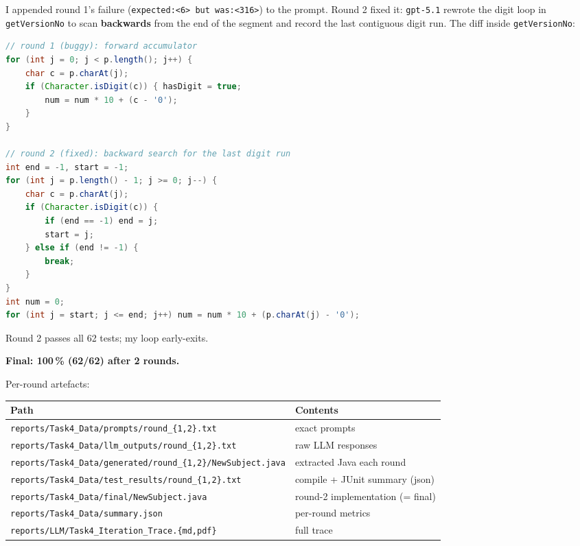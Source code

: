 \documentclass[manuscript,review,nonacm]{acmart}
\begin{document}
I appended round 1's failure (\texttt{expected:<6> but was:<316>}) to
the prompt. Round 2 fixed it: \texttt{gpt-5.1} rewrote the digit loop
in \texttt{getVersionNo} to scan \textbf{backwards} from the end of
the segment and record the last contiguous digit run. The diff inside
\texttt{getVersionNo}:

\begin{lstlisting}[language=Java]
// round 1 (buggy): forward accumulator
for (int j = 0; j < p.length(); j++) {
    char c = p.charAt(j);
    if (Character.isDigit(c)) { hasDigit = true;
        num = num * 10 + (c - '0');
    }
}

// round 2 (fixed): backward search for the last digit run
int end = -1, start = -1;
for (int j = p.length() - 1; j >= 0; j--) {
    char c = p.charAt(j);
    if (Character.isDigit(c)) {
        if (end == -1) end = j;
        start = j;
    } else if (end != -1) {
        break;
    }
}
int num = 0;
for (int j = start; j <= end; j++) num = num * 10 + (p.charAt(j) - '0');
\end{lstlisting}

Round 2 passes all 62 tests; my loop early-exits.

\medskip
\noindent\textbf{Final: 100\,\% (62/62) after 2 rounds.}

\medskip

Per-round artefacts:

\begin{small}
\begin{tabular}{ll}
\toprule
Path & Contents \\
\midrule
\texttt{reports/Task4\_Data/prompts/round\_\{1,2\}.txt}              & exact prompts                    \\
\texttt{reports/Task4\_Data/llm\_outputs/round\_\{1,2\}.txt}         & raw LLM responses                \\
\texttt{reports/Task4\_Data/generated/round\_\{1,2\}/NewSubject.java}& extracted Java each round        \\
\texttt{reports/Task4\_Data/test\_results/round\_\{1,2\}.txt}        & compile + JUnit summary (json)   \\
\texttt{reports/Task4\_Data/final/NewSubject.java}                   & round-2 implementation (= final) \\
\texttt{reports/Task4\_Data/summary.json}                            & per-round metrics                \\
\texttt{reports/LLM/Task4\_Iteration\_Trace.\{md,pdf\}}              & full trace                       \\
\bottomrule
\end{tabular}
\end{small}
\end{document}
